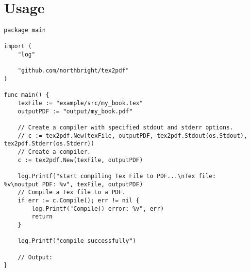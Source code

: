 \section{Usage}

\begin{verbatim}
package main

import (
	"log"

	"github.com/northbright/tex2pdf"
)

func main() {
	texFile := "example/src/my_book.tex"
	outputPDF := "output/my_book.pdf"

	// Create a compiler with specified stdout and stderr options.
	// c := tex2pdf.New(texFile, outputPDF, tex2pdf.Stdout(os.Stdout), tex2pdf.Stderr(os.Stderr))
	// Create a compiler.
	c := tex2pdf.New(texFile, outputPDF)

	log.Printf("start compiling Tex File to PDF...\nTex file: %v\noutput PDF: %v", texFile, outputPDF)
	// Compile a Tex file to a PDF.
	if err := c.Compile(); err != nil {
		log.Printf("Compile() error: %v", err)
		return
	}

	log.Printf("compile successfully")

	// Output:
}
\end{verbatim}
